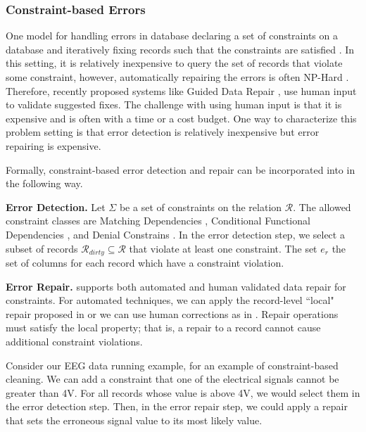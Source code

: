 \subsubsection{Constraint-based Errors}
One model for handling errors in database declaring a set of constraints on a database and 
iteratively fixing records such that the constraints are satisfied \cite{DBLP:journals/pvldb/YakoutENOI11, DBLP:journals/pvldb/FanLMTY10, khayyat2015bigdansing}.
In this setting, it is relatively inexpensive to query the set of records that violate some constraint, however, automatically repairing the errors is often NP-Hard \cite{DBLP:journals/pvldb/FanLMTY10}.
Therefore, recently proposed systems like Guided Data Repair \cite{DBLP:journals/pvldb/YakoutENOI11}, use human input to validate suggested fixes.
The challenge with using human input is that it is expensive and is often with a time or a cost budget.
One way to characterize this problem setting is that error detection is relatively inexpensive but error repairing is expensive.

Formally, constraint-based error detection and repair can be incorporated into \sys in the following way.

\vspace{0.5em}

\noindent\textbf{Error Detection. } Let $\Sigma$ be a set of constraints on the relation $\mathcal{R}$. 
The allowed constraint classes are Matching Dependencies \cite{bertossi2013data}, Conditional Functional Dependencies \cite{DBLP:journals/pvldb/FanLMTY10}, and Denial Constrains \cite{khayyat2015bigdansing}. 
In the error detection step, we select a subset of records $\mathcal{R}_{dirty} \subseteq \mathcal{R}$ that violate at least one constraint.
The set $e_r$ the set of columns for each record which have a constraint violation.

\vspace{0.5em}

\noindent\textbf{Error Repair. } \sys supports both automated and human validated data repair for constraints. For automated techniques, we can apply the record-level ``local" repair proposed in \cite{DBLP:journals/pvldb/FanLMTY10} or we can use human corrections as in \cite{DBLP:journals/pvldb/YakoutENOI11}. Repair operations must satisfy the local property; that is, a repair to a record cannot cause additional constraint violations.

\begin{example}
Consider our EEG data running example, for an example of constraint-based cleaning.
We can add a constraint that one of the electrical signals cannot be greater than 4V.
For all records whose value is above 4V, we would select them in the error detection step.
Then, in the error repair step, we could apply a repair that sets the erroneous signal value to its most likely value.
\end{example}


